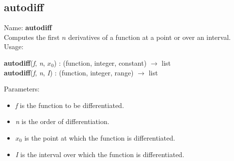 \subsection{autodiff}
\label{labautodiff}
\noindent Name: \textbf{autodiff}\\
Computes the first $n$ derivatives of a function at a point or over an interval.\\
\noindent Usage: 
\begin{center}
\textbf{autodiff}(\emph{f}, \emph{n}, \emph{$x_0$}) : (\textsf{function}, \textsf{integer}, \textsf{constant}) $\rightarrow$ \textsf{list}\\
\textbf{autodiff}(\emph{f}, \emph{n}, \emph{I}) : (\textsf{function}, \textsf{integer}, \textsf{range}) $\rightarrow$ \textsf{list}\\
\end{center}
Parameters: 
\begin{itemize}
\item \emph{f} is the function to be differentiated.
\item \emph{n} is the order of differentiation.
\item \emph{$x_0$} is the point at which the function is differentiated.
\item \emph{I} is the interval over which the function is differentiated.
\end{itemize}
